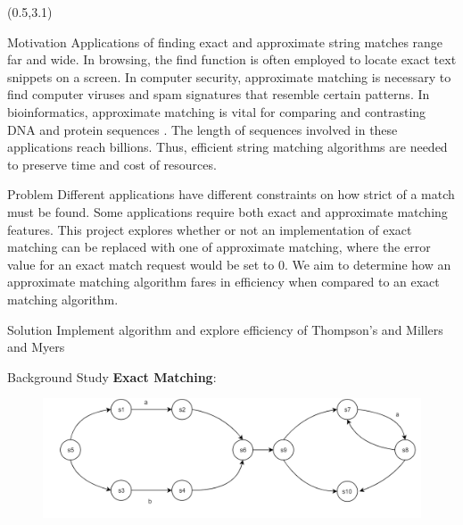 \documentclass[22pt]{beamer}
\begin{document}
\begin{frame}[fragile]
\begin{textblock}{7.25}(0.5,3.1)

\begin{block}{Motivation}
Applications of finding exact and approximate string matches range far and wide. In browsing, the find function is often employed to locate exact text snippets on a screen. In computer security, approximate matching is necessary to find computer viruses and spam signatures that resemble certain patterns. In bioinformatics, approximate matching is vital for comparing and contrasting DNA and protein sequences \cite{Approx1}. The length of sequences involved in these applications reach billions. Thus, efficient string matching algorithms are needed to preserve time and cost of resources.
\end{block}

\begin{block}{Problem}
 Different applications have different constraints on how strict of a match must be found. Some applications require both exact and approximate matching features. This project explores whether or not an implementation of exact matching can be replaced with one of approximate matching, where the error value for an exact match request would be set to 0. We aim to determine how an approximate matching algorithm fares in efficiency when compared to an exact matching algorithm.  

\end{block}

\begin{block}{Solution}
Implement algorithm and explore efficiency of Thompson's and Millers and Myers
\end{block}


\begin{block}{Background Study}
\textbf{Exact Matching}:

\begin{figure}
\includegraphics[scale=1.5]{ThompsonsNFA.PNG}
\end{figure}


\end{block}
\end{textblock}
\end{frame}
\end{document}
